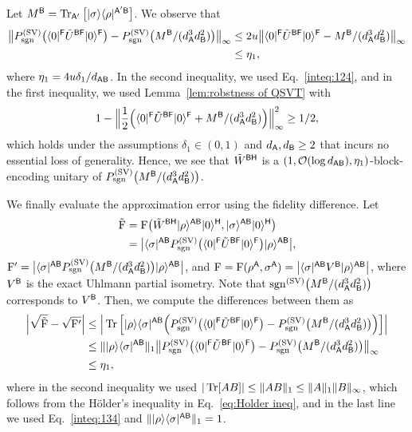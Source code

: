 Let $M^{\mathsf{B}} = \operatorname{Tr}_{{\mathsf{A}}'}\big[|\sigma\rangle\langle\rho|^{{\mathsf{A}}'{\mathsf{B}}}\big]$. 
We observe that
\begin{align}
    \big\|P_{\mathrm{sgn}}^{(\rm SV)}\big(\langle0|^{\mathsf{F}} \tilde{U}^{{\mathsf{B}}{\mathsf{F}}}|0\rangle^{\mathsf{F}}\big) - P_{\mathrm{sgn}}^{(\rm SV)}\big(M^{\mathsf{B}}/(d_{\mathsf{A}}^3d_{\mathsf{B}}^2)\big)\big\|_\infty 
    &\leq 2u \big\|\langle0|^{\mathsf{F}} \tilde{U}^{{\mathsf{B}}{\mathsf{F}}}|0\rangle^{\mathsf{F}} - M^{\mathsf{B}}/(d_{\mathsf{A}}^3 d_{\mathsf{B}}^2)\big\|_\infty \\
    \label{inteq:134}
    &\leq \eta_1,
\end{align}
where $\eta_1 = 4u\delta_1/d_{{\mathsf{A}}{\mathsf{B}}}$.
In the second inequality, we used Eq.~\eqref{inteq:124}, and in the first inequality, we used Lemma~\ref{lem:robstness of QSVT} with
\begin{align}
    1 - \Big\|\frac{1}{2}\Big(\langle0|^{\mathsf{F}} \tilde{U}^{{\mathsf{B}}{\mathsf{F}}}|0\rangle^{\mathsf{F}} + M^{\mathsf{B}}/(d_{\mathsf{A}}^3 d_{\mathsf{B}}^2)\Big)\Big\|_\infty^2 \geq 1/2,
\end{align}
which holds under the assumptions $\delta_1 \in (0, 1)$ and $d_{\mathsf{A}}, d_{\mathsf{B}} \geq 2$ that incurs no essential loss of generality.
Hence, we see that $\tilde{W}^{{\mathsf{B}}{\mathsf{H}}}$ is a $(1, {\mathcal{O}}(\log{d_{{\mathsf{A}}{\mathsf{B}}}}), \eta_1)$-block-encoding unitary of $P_{\mathrm{sgn}}^{(\rm SV)}\big(M^{\mathsf{B}}/(d_{\mathsf{A}}^3d_{\mathsf{B}}^2)\big)$.



We finally evaluate the approximation error using the fidelity difference.
Let
\begin{align}
    \tilde{{\mathrm{F}}} 
    &= {\mathrm{F}}\big(\tilde{W}^{{\mathsf{B}}{\mathsf{H}}}|\rho\rangle^{{\mathsf{A}}{\mathsf{B}}}|0\rangle^{\mathsf{H}}, |\sigma\rangle^{{\mathsf{A}}{\mathsf{B}}}|0\rangle^{\mathsf{H}}\big) \\
    &= \big|\langle\sigma|^{{\mathsf{A}}{\mathsf{B}}}P_{\mathrm{sgn}}^{(\rm SV)}\big(\langle0|^{\mathsf{F}} \tilde{U}^{{\mathsf{B}}{\mathsf{F}}}|0\rangle^{\mathsf{F}}\big)|\rho\rangle^{{\mathsf{A}}{\mathsf{B}}}\big|,
\end{align}
${\mathrm{F}}' = \big|\langle\sigma|^{{\mathsf{A}}{\mathsf{B}}}P_{\mathrm{sgn}}^{(\rm SV)}\big(M^{\mathsf{B}}/(d_{\mathsf{A}}^3d_{\mathsf{B}}^2)\big)|\rho\rangle^{{\mathsf{A}}{\mathsf{B}}}\big|$, and ${\mathrm{F}} = {\mathrm{F}}(\rho^{\mathsf{A}}, \sigma^{\mathsf{A}}) = \big|\langle\sigma|^{{\mathsf{A}}{\mathsf{B}}} V^{{\mathsf{B}}}|\rho\rangle^{{\mathsf{A}}{\mathsf{B}}}\big|$,
where $V^{\mathsf{B}}$ is the exact Uhlmann partial isometry.
Note that $\mathrm{sgn}^{(\rm SV)}\big(M^{\mathsf{B}}/(d_{\mathsf{A}}^3d_{\mathsf{B}}^2)\big)$ corresponds to $V^{\mathsf{B}}$.
Then, we compute the differences between them as
\begin{align}
    \Big|\sqrt{\tilde{{\mathrm{F}}}} - \sqrt{{\mathrm{F}}'}\Big| 
    &\leq \Big|\operatorname{Tr}\Big[|\rho\rangle\langle\sigma|^{{\mathsf{A}}{\mathsf{B}}}\Big(P_{\mathrm{sgn}}^{(\rm SV)}\big(\langle0|^{\mathsf{F}} \tilde{U}^{{\mathsf{B}}{\mathsf{F}}}|0\rangle^{\mathsf{F}}\big) - P_{\mathrm{sgn}}^{(\rm SV)}\big(M^{\mathsf{B}}/(d_{\mathsf{A}}^3d_{\mathsf{B}}^2)\big)\Big)\Big]\Big| \\
    &\leq \||\rho\rangle\langle\sigma|^{{\mathsf{A}}{\mathsf{B}}}\|_1 \big\|P_{\mathrm{sgn}}^{(\rm SV)}\big(\langle0|^{\mathsf{F}} \tilde{U}^{{\mathsf{B}}{\mathsf{F}}}|0\rangle^{\mathsf{F}}\big) - P_{\mathrm{sgn}}^{(\rm SV)}\big(M^{\mathsf{B}}/(d_{\mathsf{A}}^3d_{\mathsf{B}}^2)\big)\big\|_\infty \\
    \label{inteq:125}
    &\leq \eta_1,
\end{align}
where in the second inequality we used
$|\operatorname{Tr}[AB]| \leq \|AB\|_1 \leq \|A\|_1\|B\|_\infty$, which follows from the H\"{o}lder's inequality in Eq.~\eqref{eq:Holder ineq}, and in the last line we used Eq.~\eqref{inteq:134} and $\||\rho\rangle\langle\sigma|^{{\mathsf{A}}{\mathsf{B}}}\|_1 = 1$. 


